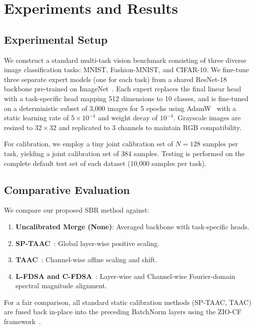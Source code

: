 \documentclass{article}
\theoremstyle{plain}
\theoremstyle{definition}
\theoremstyle{remark}
\begin{document}
\section{Experiments and Results}
\label{sec:experiments}

\subsection{Experimental Setup}
We construct a standard multi-task vision benchmark consisting of three diverse image classification tasks: MNIST, Fashion-MNIST, and CIFAR-10. We fine-tune three separate expert models (one for each task) from a shared ResNet-18 backbone pre-trained on ImageNet~\cite{he16}. Each expert replaces the final linear head with a task-specific head mapping 512 dimensions to 10 classes, and is fine-tuned on a deterministic subset of 3,000 images for 5 epochs using AdamW~\cite{loshchilov19} with a static learning rate of $5 \times 10^{-4}$ and weight decay of $10^{-4}$. Grayscale images are resized to $32 \times 32$ and replicated to 3 channels to maintain RGB compatibility.

For calibration, we employ a tiny joint calibration set of $N = 128$ samples per task, yielding a joint calibration set of 384 samples. Testing is performed on the complete default test set of each dataset (10,000 samples per task).

\subsection{Comparative Evaluation}
We compare our proposed SBR method against:
\begin{enumerate}
    \item \textbf{Uncalibrated Merge (None)}: Averaged backbone with task-specific heads.
    \item \textbf{SP-TAAC}~\cite{sptaac2026}: Global layer-wise positive scaling.
    \item \textbf{TAAC}~\cite{taac2026}: Channel-wise affine scaling and shift.
    \item \textbf{L-FDSA and C-FDSA}~\cite{fdsa2026}: Layer-wise and Channel-wise Fourier-domain spectral magnitude alignment.
\end{enumerate}
For a fair comparison, all standard static calibration methods (SP-TAAC, TAAC) are fused back in-place into the preceding BatchNorm layers using the ZIO-CF framework~\cite{ziocf2026}.
\end{document}
